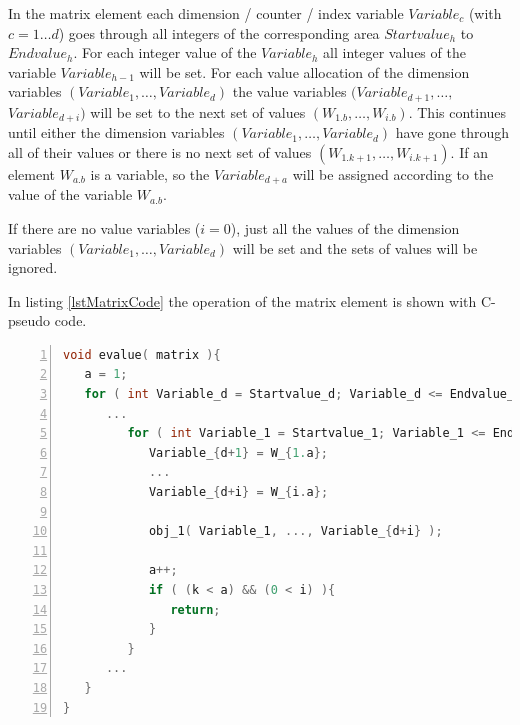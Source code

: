 In the matrix element each dimension / counter / index variable $Variable_c$ (with $c=1 \ldots d$) goes through all integers of the corresponding area $Startvalue_h$ to $Endvalue_h$. For each integer value of the $Variable_h$ all integer values of the variable $Variable_{h-1}$ will be set. For each value allocation of the dimension variables $(Variable_1, \ldots, Variable_d)$ the value variables $(Variable_{d+1}, \ldots,$ $Variable_{d+i})$ will be set to the next set of values $(W_{1.b}, \ldots, W_{i.b})$. This continues until either the dimension variables $(Variable_1, \ldots, Variable_d)$ have gone through all of their values or there is no next set of values $(W_{1.k+1}, \ldots, W_{i.k+1})$. If an element $W_{a.b}$ is a variable, so the $Variable_{d+a}$ will be assigned according to the value of the variable $W_{a.b}$.

If there are no value variables ($i=0$), just all the values of the dimension variables $(Variable_1, \ldots, Variable_d)$ will be set and the sets of values will be ignored.

In listing \ref{lstMatrixCode} the operation of the matrix element is shown with C-pseudo code.

\begin{lstlisting}[language=C, numbers=left, frame=single, caption={Pseudo algorithm of the matrix element}, label={lstMatrixCode}, breaklines, basicstyle=\footnotesize\ttfamily, numberstyle=\tiny]
void evalue( matrix ){
   a = 1;
   for ( int Variable_d = Startvalue_d; Variable_d <= Endvalue_d; Variable_d += 1 ){
      ...
         for ( int Variable_1 = Startvalue_1; Variable_1 <= Endvalue_1; Variable_1 += 1 ){
            Variable_{d+1} = W_{1.a};
            ...
            Variable_{d+i} = W_{i.a};
   
            obj_1( Variable_1, ..., Variable_{d+i} );
   
            a++;
            if ( (k < a) && (0 < i) ){
               return;
            }
         }
      ...
   }
}
\end{lstlisting}


